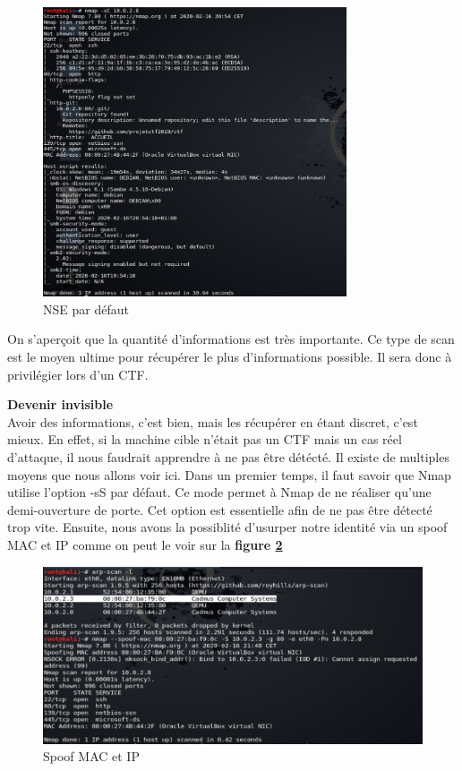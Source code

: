 \begin{figure}[t!]
  \centering
  \setlength\figureheight{7cm}
  \setlength\figurewidth{9cm}
  \includegraphics[width=0.8\textwidth]{oui/images/nmap/scriptscan.PNG}
  \caption{NSE par défaut}
  \label{fig:nse}
\end{figure}

On s'aperçoit que la quantité d'informations est très importante. Ce type de scan est le moyen ultime pour récupérer le plus d'informations possible. Il sera donc à privilégier lors d'un CTF.\\

\newpage

\noindent \textbf{Devenir invisible}\\

Avoir des informations, c'est bien, mais les récupérer en étant discret, c'est mieux. En effet, si la machine cible n'était pas un CTF mais un cas réel d'attaque, il nous faudrait apprendre à ne pas être détécté. Il existe de multiples moyens que nous allons voir ici. Dans un premier temps, il faut savoir que Nmap utilise l'option -sS par défaut. Ce mode permet à Nmap de ne réaliser qu'une demi-ouverture de porte. Cet option est essentielle afin de ne pas être détecté trop vite. Ensuite, nous avons la possiblité d'usurper notre identité via un spoof MAC et IP comme on peut le voir sur la \textbf{figure \ref{fig:spoofip}}\\

\begin{figure}[]
  \centering
  \setlength\figureheight{7cm}
  \setlength\figurewidth{9cm}
  \includegraphics[width=1\textwidth]{oui/images/nmap/spoof.PNG}
  \caption{Spoof MAC et IP}
  \label{fig:spoofip}
\end{figure}

